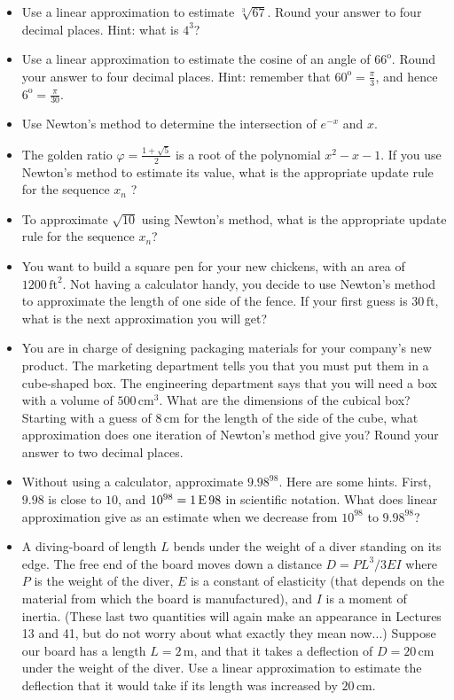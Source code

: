 \documentclass[twoside,openright,titlepage,a4paper]{book}
\begin{document}
\begin{sloppypar}
\begin{itemize}
\item Use a linear approximation to estimate $\sqrt[3]{67}$. Round your answer to four decimal places. Hint: what is $4^3$?
\item Use a linear approximation to estimate the cosine of an angle of $66^\mathrm{o}$. Round your answer to four decimal places. Hint: remember that $\displaystyle 60^\mathrm{o} = \frac{\pi}{3}$, and hence $\displaystyle 6^\mathrm{o} = \frac{\pi}{30}$.
\item Use Newton's method to determine the intersection of $e^{-x}$ and $x$.
\item The golden ratio $\displaystyle \varphi = \frac{1+\sqrt{5}}{2}$ is a root of the polynomial $x^2-x-1$. If you use Newton's method to estimate its value, what is the appropriate update rule for the sequence $x_n$ ?
\item To approximate $\sqrt{10}$ using Newton's method, what is the appropriate update rule for the sequence $x_n$?
\item You want to build a square pen for your new chickens, with an area of $1200\,\mathrm{ft}^2$. Not having a calculator handy, you decide to use Newton's method to approximate the length of one side of the fence. If your first guess is $30\,\mathrm{ft}$, what is the next approximation you will get?
\item You are in charge of designing packaging materials for your company's new product. The marketing department tells you that you must put them in a cube-shaped box. The engineering department says that you will need a box with a volume of $500\,\mathrm{cm}^3$. What are the dimensions of the cubical box? Starting with a guess of $8\,\mathrm{cm}$ for the length of the side of the cube, what approximation does one iteration of Newton's method give you? Round your answer to two decimal places.
\item Without using a calculator, approximate $9.98^{98}$. Here are some hints. First, $9.98$ is close to $10$, and $10^{98}=1\,{\rm E}\,98$ in scientific notation. What does linear approximation give as an estimate when we decrease from $10^{98}$ to $9.98^{98}$?
\item A diving-board of length $L$ bends under the weight of a diver standing on its edge. The free end of the board moves down a distance $D = PL^3/3EI $ where $P$ is the weight of the diver, $E$ is a constant of elasticity (that depends on the material from which the board is manufactured), and $I$ is a moment of inertia. (These last two quantities will again make an appearance in Lectures 13 and 41, but do not worry about what exactly they mean now...) Suppose our board has a length $L = 2\,\mathrm{m}$, and that it takes a deflection of $D = 20\,\mathrm{cm}$ under the weight of the diver. Use a linear approximation to estimate the deflection that it would take if its length was increased by $20\,\mathrm{cm}$.
\end{itemize}		


\end{sloppypar}
\end{document}
